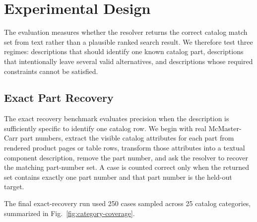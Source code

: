 \documentclass[colorlinks,upint,subscriptcorrection,varvw,hyphenate,balance,nofoot]{asmeconf}
\begin{document}
\section{Experimental Design}

The evaluation measures whether the resolver returns the correct catalog match set from text rather than a plausible ranked search result. We therefore test three regimes: descriptions that should identify one known catalog part, descriptions that intentionally leave several valid alternatives, and descriptions whose required constraints cannot be satisfied.

\subsection{Exact Part Recovery}

The exact recovery benchmark evaluates precision when the description is sufficiently specific to identify one catalog row. We begin with real McMaster-Carr part numbers, extract the visible catalog attributes for each part from rendered product pages or table rows, transform those attributes into a textual component description, remove the part number, and ask the resolver to recover the matching part-number set. A case is counted correct only when the returned set contains exactly one part number and that part number is the held-out target.

The final exact-recovery run used 250 cases sampled across 25 catalog categories, summarized in Fig.~\ref{fig:category-coverage}.
\end{document}
